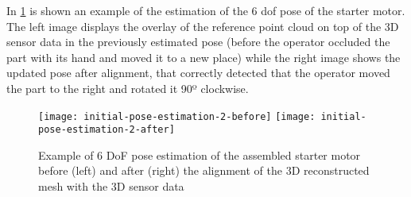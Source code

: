 In \cref{fig:initial-pose-estimation} is shown an example of the estimation of the 6 \gls{dof} pose of the starter motor. The left image displays the overlay of the reference point cloud on top of the 3D sensor data in the previously estimated pose (before the operator occluded the part with its hand and moved it to a new place) while the right image shows the updated pose after alignment, that correctly detected that the operator moved the part to the right and rotated it 90º clockwise.

\begin{figure}[!ht]
	\centering
	\texttt{[image: initial-pose-estimation-2-before]}
	\texttt{[image: initial-pose-estimation-2-after]}
	\caption{Example of 6 DoF pose estimation of the assembled starter motor before (left) and after (right) the alignment of the 3D reconstructed mesh with the 3D sensor data}
	\label{fig:initial-pose-estimation}
\end{figure}
